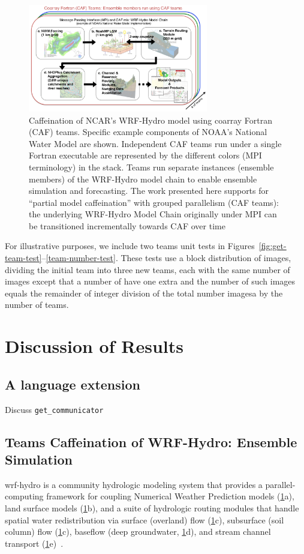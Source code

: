 \begin{figure}
\includegraphics[width=0.7\textwidth]{figures/WRF-Hydro-caf-ens-model_chain.png}
\vspace{-7pt}
\caption{Caffeination of NCAR's WRF-Hydro model using coarray Fortran (CAF)
  teams. Specific example components of  NOAA's National Water
  Model are shown. Independent CAF teams run under a single Fortran executable are represented by the different colors
  (MPI terminology) in the stack.  Teams run separate instances
  (ensemble members) of the WRF-Hydro model chain to enable ensemble
  simulation and forecasting. The work presented  here supports for ``partial model caffeination'' with grouped
  parallelism (CAF teams): the underlying WRF-Hydro Model Chain
  originally under MPI can be transitioned incrementally towards CAF
  over time\label{fig:caffeinate-wrf-hydro}}
\end{figure}
%

For illustrative purposes, we include two teams unit tests in
Figures~\ref{fig:get-team-test}--\ref{team-number-test}.  These tests use a block distribution of images,
dividing the initial team into three new teams, each with the same number of images except that a number of
have one extra and the number of such images equals the remainder of integer division of the total
number imagesa by the number of teams.

\section{Discussion of Results}\label{sec:discussion}
\subsection{A language extension}
Discuss \lstinline|get_communicator|

\subsection{Teams Caffeination of WRF-Hydro: Ensemble Simulation}
\gls{wrf-hydro} is a community hydrologic modeling system that provides a parallel-computing
framework for coupling Numerical Weather Prediction models (\ref{fig:caffeinate-wrf-hydro}a), land surface models
(\ref{fig:caffeinate-wrf-hydro}b), and a suite of hydrologic routing modules that handle spatial water redistribution
via surface (overland) flow (\ref{fig:caffeinate-wrf-hydro}c), subsurface (soil column) flow (\ref{fig:caffeinate-wrf-hydro}c),
baseflow (deep groundwater, \ref{fig:caffeinate-wrf-hydro}d), and stream channel transport
(\ref{fig:caffeinate-wrf-hydro}e)~\cite{gochisEtal2014}.

